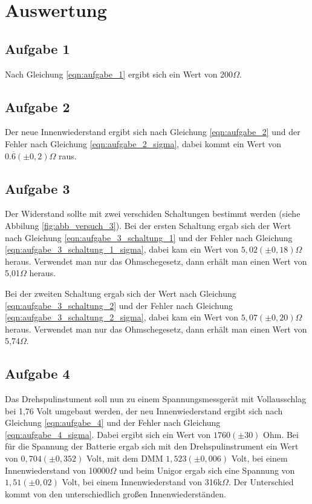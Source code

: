 \documentclass[12pt]{scrartcl}
\begin{document}
\newpage


\section{Auswertung}

\subsection{Aufgabe 1}
Nach Gleichung \ref{eqn:aufgabe_1} ergibt sich ein Wert von 200$\Omega$.

\subsection{Aufgabe 2}
Der neue Innenwiederstand ergibt sich nach Gleichung \ref{eqn:aufgabe_2} und der Fehler nach Gleichung \ref{eqn:aufgabe_2_sigma}, dabei kommt ein Wert von $0.\overline{6}(\pm 0,2)\Omega$ raus.

\subsection{Aufgabe 3}
Der Widerstand sollte mit zwei verschiden Schaltungen bestimmt werden (siehe Abbilung \ref{fig:abb_versuch_3}).
Bei der ersten Schaltung ergab sich der Wert nach Gleichung \ref{eqn:aufgabe_3_schaltung_1} und der Fehler nach Gleichung \ref{eqn:aufgabe_3_schaltung_1_sigma}, dabei kam ein Wert von $5,02	(\pm 0,18)\Omega$ heraus.
Verwendet man nur das Ohmschegesetz, dann erhält man einen Wert von 5,01$\Omega$ heraus.

Bei der zweiten Schaltung ergab sich der Wert nach Gleichung \ref{eqn:aufgabe_3_schaltung_2} und der Fehler nach Gleichung \ref{eqn:aufgabe_3_schaltung_2_sigma}, dabei kam ein Wert von $5,07 (\pm 0,20)\Omega$ heraus.
Verwendet man nur das Ohmschegesetz, dann erhält man einen Wert von 5,74$\Omega$.

\subsection{Aufgabe 4}
Das Drehspulinstument soll nun zu einem Spannungsmessgerät mit Vollausschlag bei 1,76 Volt umgebaut werden, der neu Innenwiederstand ergibt sich nach Gleichung \ref{eqn:aufgabe_4} und der Fehler nach Gleichung \ref{eqn:aufgabe_4_sigma}.
Dabei ergibt sich ein Wert von $1760 (\pm 30)$ Ohm.
Bei für die Spannung der Batterie ergab sich mit den Drehspulinstrument ein Wert von $0,704 (\pm 0,352)$ Volt, mit dem DMM $1,523 (\pm 0,006)$ Volt, bei einem Innenwiederstand von 10000$\Omega$ und beim Unigor ergab sich eine Spannung von $1,51 (\pm 0,02)$ Volt, bei einem Innenwiederstand von 316k$\Omega$.
Der Unterschied kommt von den unterschiedlich großen Innenwiederständen.
\end{document}
